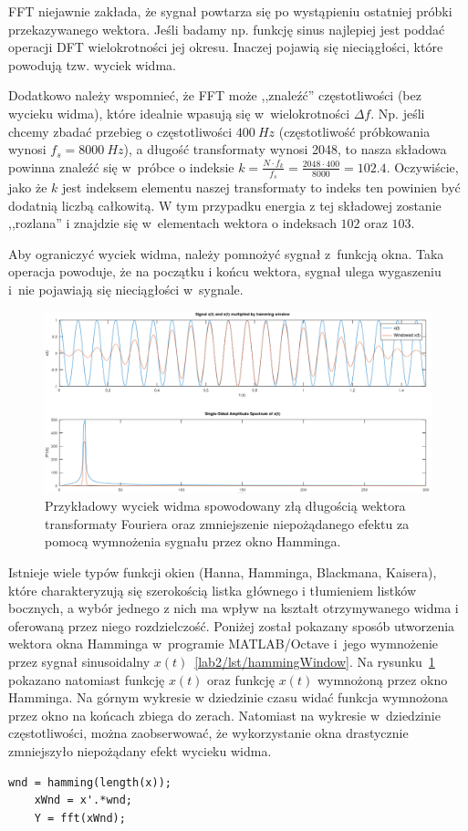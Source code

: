 FFT niejawnie zakłada, że sygnał powtarza się po wystąpieniu ostatniej próbki przekazywanego wektora. Jeśli badamy np. funkcję sinus najlepiej jest poddać operacji DFT wielokrotności jej okresu. Inaczej pojawią się nieciągłości, które powodują tzw. wyciek widma. 

Dodatkowo należy wspomnieć, że FFT może ,,znaleźć'' częstotliwości (bez wycieku widma), które idealnie wpasują się w~wielokrotności $\Delta f$. Np. jeśli chcemy zbadać przebieg o częstotliwości $400~Hz$ (częstotliwość próbkowania wynosi $f_s = 8000~Hz$), a długość transformaty wynosi 2048, to nasza składowa powinna znaleźć się w~próbce o indeksie $k = \frac{N\cdot f_k}{f_s} = \frac{2048\cdot400}{8000} = 102.4$. Oczywiście, jako że $k$ jest indeksem elementu naszej transformaty to indeks ten powinien być dodatnią liczbą całkowitą. W tym przypadku energia z tej składowej zostanie ,,rozlana'' i znajdzie się w~elementach wektora o indeksach $102$ oraz $103$.

Aby ograniczyć wyciek widma, należy pomnożyć sygnał z~funkcją okna. Taka operacja powoduje, że na początku i końcu wektora, sygnał ulega wygaszeniu i~nie pojawiają się nieciągłości w~sygnale. 
\begin{figure}[hbt!]
	\centering
	\includegraphics[width=0.9\linewidth]{images/spectralLeakage.png}
	\caption{Przykładowy wyciek widma spowodowany złą długością wektora transformaty Fouriera oraz zmniejszenie niepożądanego efektu za pomocą wymnożenia sygnału przez okno Hamminga.}
	\label{lab2/fig/spectralLeakage}
\end{figure}
Istnieje wiele typów funkcji okien (Hanna, Hamminga, Blackmana, Kaisera), które charakteryzują się szerokością listka głównego i tłumieniem listków bocznych, a wybór jednego z nich ma wpływ na kształt otrzymywanego widma i oferowaną przez niego rozdzielczość. Poniżej został pokazany sposób utworzenia wektora okna Hamminga w~programie MATLAB/Octave i~jego wymnożenie przez sygnał sinusoidalny $x(t)$~\ref{lab2/lst/hammingWindow}. Na rysunku~\ref{lab2/fig/spectralLeakage} pokazano natomiast funkcję $x(t)$ oraz funkcję $x(t)$ wymnożoną przez okno Hamminga. Na górnym wykresie w dziedzinie czasu widać funkcja wymnożona przez okno na końcach zbiega do zerach. Natomiast na wykresie w~dziedzinie częstotliwości,  można zaobserwować, że wykorzystanie okna drastycznie zmniejszyło niepożądany efekt wycieku widma.    
\begin{lstlisting}[caption=Wymnożenie sygnału $x(t)$ przez okno Hamminga , label=lab2/lst/hammingWindow]
	wnd = hamming(length(x));
	xWnd = x'.*wnd;
	Y = fft(xWnd);
\end{lstlisting}


